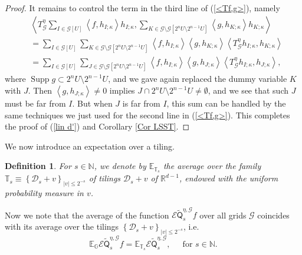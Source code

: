 \documentclass{amsart}%
\theoremstyle{plain}
\newtheorem{definition}[theorem]{Definition}
\numberwithin{equation}{section}
\begin{document}
\begin{proof}
It remains to control the term in the third line of (\ref{<Tf,g>}), namely%
\begin{align*}
& \left\langle T_{\mathcal{G}}^{\eta}\sum_{I\in\mathcal{G}\left[  U\right]
}\left\langle f,h_{I;\kappa}\right\rangle h_{I;\kappa},\sum_{K\in
\mathcal{G}\setminus\mathcal{G}\left[  2^{n}U\setminus2^{n-1}U\right]
}\left\langle g,h_{K;\kappa}\right\rangle h_{K;\kappa}\right\rangle \\
& =\sum_{I\in\mathcal{G}\left[  U\right]  }\sum_{K\in\mathcal{G}%
\setminus\mathcal{G}\left[  2^{n}U\setminus2^{n-1}U\right]  }\left\langle
f,h_{I;\kappa}\right\rangle \left\langle g,h_{K;\kappa}\right\rangle
\left\langle T_{\mathcal{G}}^{\eta}h_{I;\kappa},h_{K;\kappa}\right\rangle \\
& =\sum_{I\in\mathcal{G}\left[  U\right]  }\sum_{J\in\mathcal{G}%
\setminus\mathcal{G}\left[  2^{n}U\setminus2^{n-1}U\right]  }\left\langle
f,h_{I;\kappa}\right\rangle \left\langle g,h_{J;\kappa}\right\rangle
\left\langle T_{\mathcal{G}}^{\eta}h_{I;\kappa},h_{J;\kappa}\right\rangle ,
\end{align*}
where $\operatorname*{Supp}g\subset2^{n}U\setminus2^{n-1}U$, and we gave again
replaced the dummy variable $K$ with $J$. Then $\left\langle g,h_{J;\kappa
}\right\rangle \neq0$ implies $J\cap2^{n}U\setminus2^{n-1}U\neq\emptyset$, and
we see that such $J\,$must be far from $I$. But when $J$ is far from $I$, this
sum can be handled by the same techniques we just used for the second line in
(\ref{<Tf,g>}). This completes the proof of (\ref{lin d'}) and Corollary
\ref{Cor LSST}.
\end{proof}

We now introduce an expectation over a tiling.

\begin{definition}
For $s\in\mathbb{N}$, we denote by $\mathbb{E}_{\mathbb{T}_{s}}$ the average
over the family $\mathbb{T}_{s}\equiv\left\{  \mathcal{D}_{s}+v\right\}
_{\left\vert v\right\vert \leq2^{-s}}$ of tilings $\mathcal{D}_{s}+v$ of
$\mathbb{R}^{d-1}$, endowed with the uniform probability measure in $v$.
\end{definition}

Now we note that the average of the function $\mathcal{E}\widetilde
{\mathsf{Q}}_{s}^{\eta,\mathcal{G}}f$ over all grids $\mathcal{G}$ coincides
with its average over the tilings $\left\{  \mathcal{D}_{s}+v\right\}
_{\left\vert v\right\vert \leq2^{-s}}$, i.e.
\begin{equation}
\mathbb{E}_{\mathbb{G}}\mathcal{E}\widetilde{\mathsf{Q}}_{s}^{\eta
,\mathcal{G}}f=\mathbb{E}_{\mathbb{T}_{s}}\mathcal{E}\widetilde{\mathsf{Q}%
}_{s}^{\eta,\mathcal{G}},\ \ \ \ \ \text{ for }s\in\mathbb{N}\text{.}%
\label{eq}%
\end{equation}
\end{document}
